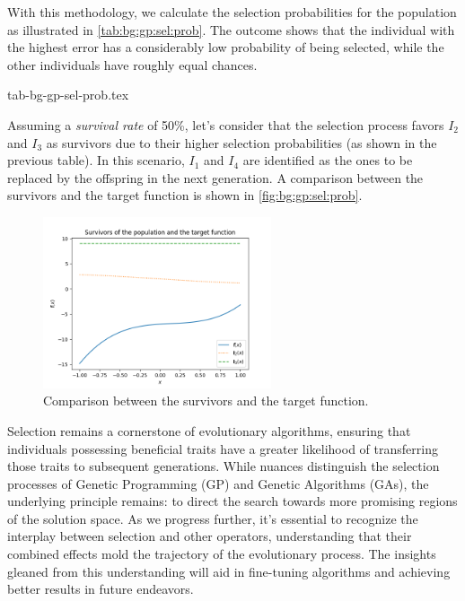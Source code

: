   With this methodology, we calculate the selection probabilities for the 
  population as illustrated in \vref{tab:bg:gp:sel:prob}.
  The outcome shows that 
  the individual with the highest error has a considerably low probability of 
  being selected, while the other individuals have roughly equal chances.

  {tab-bg-gp-sel-prob.tex}

  Assuming a \emph{survival rate} of 50\%, let's consider that the selection
  process favors \(I_2\) and \(I_3\) as survivors due to their higher selection
  probabilities (as shown in the previous table).
  In this scenario, \(I_1\) and \(I_4\) are identified as the ones to be replaced
  by the offspring in the next generation.
  A comparison between the survivors and the target function is shown in
  \vref{fig:bg:gp:sel:prob}.

  \begin{figure}[ht!]
    \centering
    \includegraphics[width=0.6\textwidth]{img/theoretical_framework/gp_pop_sel_survivors.png}
    \caption{Comparison between the survivors and the target function.}
    \label{fig:bg:gp:sel:prob}
  \end{figure}

  Selection remains a cornerstone of evolutionary algorithms, ensuring that 
  individuals possessing beneficial traits have a greater likelihood of 
  transferring those traits to subsequent generations. While nuances 
  distinguish the selection processes of Genetic Programming (GP) and Genetic 
  Algorithms (GAs), the underlying principle remains: to direct the search 
  towards more promising regions of the solution space. As we progress further, 
  it's essential to recognize the interplay between selection and other 
  operators, understanding that their combined effects mold the trajectory of 
  the evolutionary process. The insights gleaned from this understanding will 
  aid in fine-tuning algorithms and achieving better results in future 
  endeavors.
